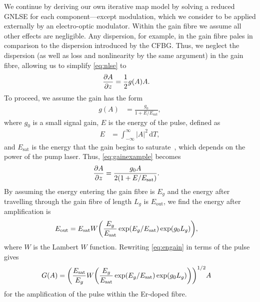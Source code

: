 \documentclass[9pt,twocolumn,twoside]{osajnl}
\let\originalleft\left
\let\originalright\right
\renewcommand{\left}{\mathopen{}\mathclose\bgroup\originalleft}
\renewcommand{\right}{\aftergroup\egroup\originalright}
\providecommand{\df}{\textrm{d}} %
\newcommand{\pdiff}[3][\hspace{-0.5pt}]{\frac{\partial^{#1}#2}{\partial{#3}^{#1}}} %
\newcommand{\Es}{E_{\textrm{sat}}} %
\begin{document}
We continue by deriving our own iterative map model by solving a reduced GNLSE for each component---except modulation, which we consider to be applied externally by an electro-optic modulator. Within the gain fibre we assume all other effects are negligible. Any dispersion, for example, in the gain fibre pales in comparison to the dispersion introduced by the CFBG. Thus, we neglect the dispersion (as well as loss and nonlinearity by the same argument) in the gain fibre, allowing us to simplify \eqref{eq:nlse} to
\begin{align}
	\pdiff{A}{z} &= \frac{1}{2}g(A)A.
	\label{eq:gainexample}
\end{align}
To proceed, we assume the gain has the form
\begin{align}
	g(A) &= \frac{g_0}{1 + E / \Es},
\end{align}
where $g_0$ is a small signal gain, $E$ is the energy of the pulse, defined as
\begin{align}
	E &= \int_{-\infty}^\infty |A|^2 \, \df T,
	\label{eq:energy}
\end{align}
and $\Es$ is the energy that the gain begins to saturate~\cite{haus1984, shtyrina2017, silfvast2004}, which depends on the power of the pump laser. Thus, \eqref{eq:gainexample} becomes
\begin{align}
	\pdiff{A}{z} &= \frac{g_0 A}{2 \left( 1 + E / \Es \right)}.
\end{align}
By assuming the energy entering the gain fibre is $E_g$ and the energy after travelling through the gain fibre of length $L_g$ is $E_{\text{out}}$, we find the energy after amplification is
\begin{align}
	\label{eq:engain}
	E_{\text{out}} &= \Es W \left( \frac{E_g}{\Es} \exp( E_g / \Es ) \exp( g_0 L_g ) \right),
\end{align}
where $W$ is the Lambert $W$ function. Rewriting \eqref{eq:engain} in terms of the pulse gives
\begin{align}
	G(A) &= \left( \frac{\Es}{E_g} W \left( \frac{E_g}{\Es} \exp( E_g / \Es ) \exp( g_0 L_g ) \right) \right)^{1/2} A
	\label{eq:gainform}
\end{align}
for the amplification of the pulse within the Er-doped fibre.
\end{document}
